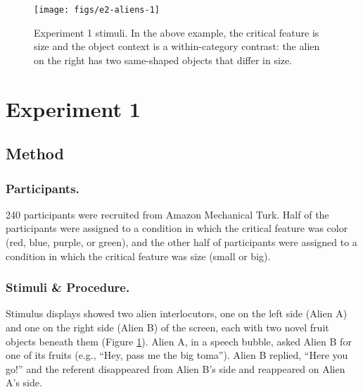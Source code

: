 \documentclass{ucetd}
\begin{document}
\begin{figure}[!tb]

{\centering \texttt{[image: figs/e2-aliens-1]} 

}

\caption{Experiment 1 stimuli. In the above example, the critical feature is size and the object context is a within-category contrast: the alien on the right has two same-shaped objects that differ in size.}\label{fig:e2-aliens}
\end{figure}

\hypertarget{experiment-1}{%
\section{Experiment 1}\label{experiment-1}}

\hypertarget{method-1}{%
\subsection{Method}\label{method-1}}

\hypertarget{participants.}{%
\subsubsection{Participants.}\label{participants.}}

240 participants were recruited from Amazon Mechanical Turk. Half of the
participants were assigned to a condition in which the critical feature
was color (red, blue, purple, or green), and the other half of
participants were assigned to a condition in which the critical feature
was size (small or big).

\hypertarget{stimuli-procedure.}{%
\subsubsection{Stimuli \& Procedure.}\label{stimuli-procedure.}}

Stimulus displays showed two alien interlocutors, one on the left side
(Alien A) and one on the right side (Alien B) of the screen, each with
two novel fruit objects beneath them (Figure \ref{fig:e2-aliens}). Alien
A, in a speech bubble, asked Alien B for one of its fruits (e.g., ``Hey,
pass me the big toma''). Alien B replied, ``Here you go!'' and the
referent disappeared from Alien B's side and reappeared on Alien A's
side.
\end{document}
